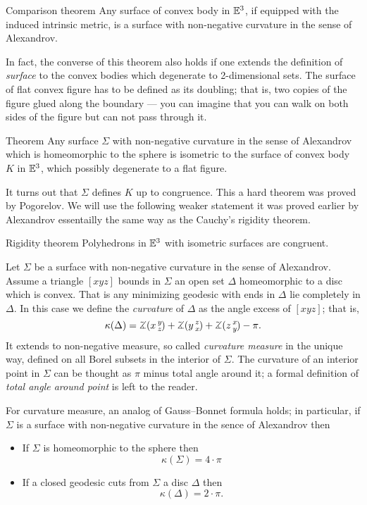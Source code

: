 \documentclass[oneside,a4paper, 12pt]{article}
\begin{document}
\begin{thm}{Comparison theorem}
Any surface of convex body in $\mathbb{E}^3$,
if equipped with the induced intrinsic metric, 
is a surface with non-negative curvature in the sense of Alexandrov.
\end{thm}

In fact, the converse of this theorem also holds
if one extends the definition of \emph{surface} 
to the convex bodies which degenerate to 2-dimensional sets.
The surface of flat convex figure has to be defined as its doubling;
that is, two copies 
of the figure glued along the boundary --- you can imagine that you can walk on both sides of the figure but can not pass through it.

\begin{thm}{Theorem}
Any surface $\Sigma$ with non-negative curvature in the sense of Alexandrov which is homeomorphic to the sphere
is isometric to the surface of convex body $K$ in $\mathbb{E}^3$,
which possibly degenerate to a flat figure.
\end{thm}

It turns out that $\Sigma$ defines $K$ up to congruence.
This a hard theorem was proved by Pogorelov.
We will use the following weaker statement
it was proved earlier by Alexandrov essentailly the same way as the Cauchy's rigidity theorem.

\begin{thm}{Rigidity theorem}
Polyhedrons in $\mathbb{E}^3$ with isometric surfaces are congruent. 
\end{thm}

Let $\Sigma$ be a surface with non-negative curvature in the sense of Alexandrov.
Assume a triangle $[xyz]$ bounds in $\Sigma$ an open set $\Delta$ homeomorphic to a disc which is convex.
That is any minimizing geodesic with ends in $\Delta$
lie completely in $\Delta$.
In this case we define the \emph{curvature} of $\Delta$ as the angle excess of $[xyz]$;
that is,
\[\kappa(\Delta)=\angk x y z+\angk  y z x+\angk z x y-\pi.\]
It extends to non-negative measure, so called \emph{curvature measure} in the unique way, defined on all Borel subsets in the interior of $\Sigma$.
The curvature of an interior point in $\Sigma$ can be thought as $\pi$ minus total angle around it;
a formal definition of \emph{total angle around point} is left to the reader.

For curvature measure, an analog of Gauss--Bonnet formula holds;
in particular, if $\Sigma$ is a surface with non-negative curvature in the sence of Alexandrov then
\begin{itemize}
\item If $\Sigma$ is homeomorphic to the sphere then 
\[\kappa(\Sigma)=4\cdot\pi\]
\item If a closed geodesic cuts from $\Sigma$ a disc $\Delta$ then 
\[\kappa(\Delta)=2\cdot\pi.\]
\end{itemize}
\end{document}
